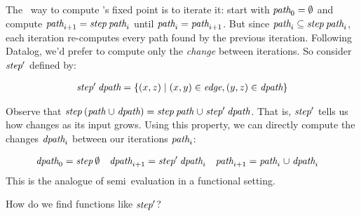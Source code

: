 \noindent
The \naive\ way to compute 's fixed point is to iterate it: start
with \(\text{\itshape path}_0 = \emptyset\) and compute \(\name{path}_{i+1} =
\name{step}\<\name{path}_i\) until \(\text{\itshape path}_i = \text{\itshape path}_{i+1}\).
%
But since $\name{path}_i \subseteq \name{step}\<\name{path}_i$, each iteration
re-computes every path found by the previous iteration.
%
Following Datalog, we'd prefer to compute only the \emph{change} between
iterations.
%
So consider $\text{\itshape step}'$ defined by:

\nopagebreak[2]
\[\begin{array}{l}
  \text{\itshape step}' \mskip 4mu plus 4mu minus 1mu\text{\itshape dpath} =
  \{(x,z) \mathrel{|} (x,y) \in \text{\itshape edge}, (y,z) \in \text{\itshape dpath}\}
\end{array}\]

\noindent
Observe that $\name{step} \<(\name{path} \cup \name{dpath}) =
\name{step}\<\name{path} \cup \name{step}'\<\name{dpath}$.
%
That is, $\text{\itshape step}'$ tells us how  changes as its input grows.
%
Using this property, we can directly compute the changes $\text{\itshape dpath}_i$
between our iterations $\text{\itshape path}_i$:

\begin{align*}
  \name{dpath}_0 &= \name{step}\<\emptyset
  & \name{dpath}_{i+1} &= \name{step}'\<\name{dpath}_i
  & \name{path}_{i+1} &= \name{path}_i \cup \name{dpath}_i
\end{align*}
%
%
This is the analogue of semi\naive\ evaluation in a functional setting.

How do we find functions like $\text{\itshape step}'$?
%






